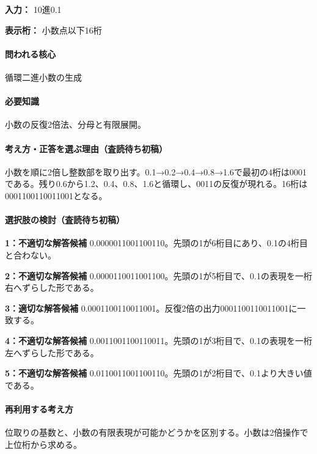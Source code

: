 \noindent\textbf{入力：} 10進0.1\par

\noindent\textbf{表示桁：} 小数点以下16桁\par

\paragraph{問われる核心} 循環二進小数の生成

\paragraph{必要知識} 小数の反復2倍法、分母と有限展開。

\paragraph{考え方・正答を選ぶ理由（査読待ち初稿）} 小数を順に2倍し整数部を取り出す。0.1→0.2→0.4→0.8→1.6で最初の4桁は0001である。残り0.6から1.2、0.4、0.8、1.6と循環し、0011の反復が現れる。16桁は0001100110011001となる。

\paragraph{選択肢の検討（査読待ち初稿）}\mbox{}\par

\noindent\textbf{1：不適切な解答候補} 0.0000011001100110。先頭の1が6桁目にあり、0.1の4桁目と合わない。\par

\noindent\textbf{2：不適切な解答候補} 0.0000110011001100。先頭の1が5桁目で、0.1の表現を一桁右へずらした形である。\par

\noindent\textbf{3：適切な解答候補} 0.0001100110011001。反復2倍の出力0001100110011001に一致する。\par

\noindent\textbf{4：不適切な解答候補} 0.0011001100110011。先頭の1が3桁目で、0.1の表現を一桁左へずらした形である。\par

\noindent\textbf{5：不適切な解答候補} 0.0110011001100110。先頭の1が2桁目で、0.1より大きい値である。\par

\paragraph{再利用する考え方} 位取りの基数と、小数の有限表現が可能かどうかを区別する。小数は2倍操作で上位桁から求める。

